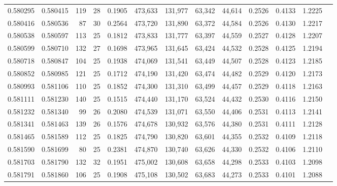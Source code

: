 \begin{tabular}{rrrrrrrrrrrrr}
0.580295 & 0.580415 & 119 &  28 &                                     0.1905 & 473,633 & 131,977 &  63,342 &  44,614 & 0.2526 & 0.4133 & 1.2225 \\
0.580416 & 0.580536 &  87 &  30 &                                     0.2564 & 473,720 & 131,890 &  63,372 &  44,584 & 0.2526 & 0.4130 & 1.2217 \\
0.580538 & 0.580597 & 113 &  25 &                                     0.1812 & 473,833 & 131,777 &  63,397 &  44,559 & 0.2527 & 0.4128 & 1.2207 \\
0.580599 & 0.580710 & 132 &  27 &                                     0.1698 & 473,965 & 131,645 &  63,424 &  44,532 & 0.2528 & 0.4125 & 1.2194 \\
0.580718 & 0.580847 & 104 &  25 &                                     0.1938 & 474,069 & 131,541 &  63,449 &  44,507 & 0.2528 & 0.4123 & 1.2185 \\
0.580852 & 0.580985 & 121 &  25 &                                     0.1712 & 474,190 & 131,420 &  63,474 &  44,482 & 0.2529 & 0.4120 & 1.2173 \\
0.580993 & 0.581106 & 110 &  25 &                                     0.1852 & 474,300 & 131,310 &  63,499 &  44,457 & 0.2529 & 0.4118 & 1.2163 \\
0.581111 & 0.581230 & 140 &  25 &                                     0.1515 & 474,440 & 131,170 &  63,524 &  44,432 & 0.2530 & 0.4116 & 1.2150 \\
0.581232 & 0.581340 &  99 &  26 &                                     0.2080 & 474,539 & 131,071 &  63,550 &  44,406 & 0.2531 & 0.4113 & 1.2141 \\
0.581341 & 0.581463 & 139 &  26 &                                     0.1576 & 474,678 & 130,932 &  63,576 &  44,380 & 0.2531 & 0.4111 & 1.2128 \\
0.581465 & 0.581589 & 112 &  25 &                                     0.1825 & 474,790 & 130,820 &  63,601 &  44,355 & 0.2532 & 0.4109 & 1.2118 \\
0.581590 & 0.581699 &  80 &  25 &                                     0.2381 & 474,870 & 130,740 &  63,626 &  44,330 & 0.2532 & 0.4106 & 1.2110 \\
0.581703 & 0.581790 & 132 &  32 &                                     0.1951 & 475,002 & 130,608 &  63,658 &  44,298 & 0.2533 & 0.4103 & 1.2098 \\
0.581791 & 0.581860 & 106 &  25 &                                     0.1908 & 475,108 & 130,502 &  63,683 &  44,273 & 0.2533 & 0.4101 & 1.2088 \\

\end{tabular}
